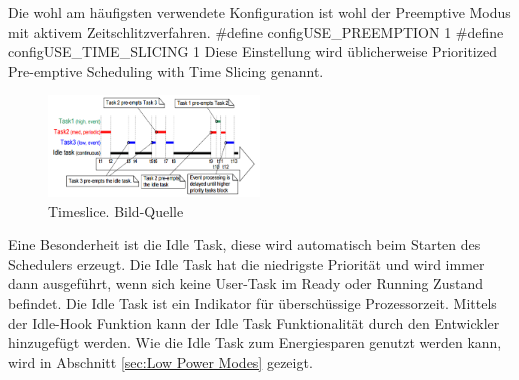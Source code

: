 \newline
Die wohl am häufigsten verwendete Konfiguration ist wohl der Preemptive Modus mit aktivem Zeitschlitzverfahren.
\newline
\#define configUSE\_PREEMPTION 1
\newline
\#define configUSE\_TIME\_SLICING 1
\newline
Diese Einstellung wird üblicherweise Prioritized Pre-emptive Scheduling with Time Slicing genannt.
\begin{figure}[htb]
	\centering
		\includegraphics[width=0.5\textwidth]{Pictures/Scheduling/timeslice.png}
	\caption{Timeslice. Bild-Quelle~\protect{}}
	\label{fig:timeslice}
\end{figure}







Eine Besonderheit ist die Idle Task, diese wird automatisch beim Starten des Schedulers erzeugt. Die Idle Task hat die niedrigste Priorität und wird immer dann ausgeführt, wenn sich keine User-Task im Ready oder Running Zustand befindet. Die Idle Task ist ein Indikator für überschüssige Prozessorzeit. Mittels der Idle-Hook Funktion kann der Idle Task Funktionalität durch den Entwickler hinzugefügt werden. Wie die Idle Task zum Energiesparen genutzt werden kann, wird in Abschnitt \ref{sec:Low Power Modes} gezeigt.
